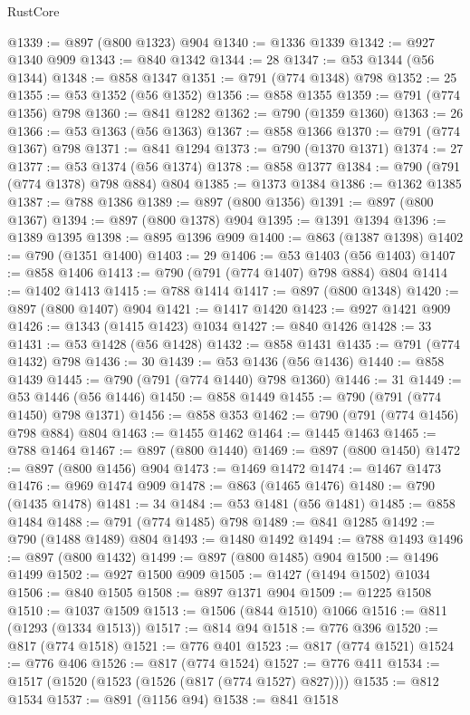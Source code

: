\begin{lexlean}{RustCore}
\begin{coremodule}
@1339 := @897 (@800 @1323) @904
@1340 := @1336 @1339
@1342 := @927 @1340 @909
@1343 := @840 @1342
@1344 := 28
@1347 := @53 @1344 (@56 @1344)
@1348 := @858 @1347
@1351 := @791 (@774 @1348) @798
@1352 := 25
@1355 := @53 @1352 (@56 @1352)
@1356 := @858 @1355
@1359 := @791 (@774 @1356) @798
@1360 := @841 @1282
@1362 := @790 (@1359 @1360)
@1363 := 26
@1366 := @53 @1363 (@56 @1363)
@1367 := @858 @1366
@1370 := @791 (@774 @1367) @798
@1371 := @841 @1294
@1373 := @790 (@1370 @1371)
@1374 := 27
@1377 := @53 @1374 (@56 @1374)
@1378 := @858 @1377
@1384 := @790 (@791 (@774 @1378) @798 @884) @804
@1385 := @1373 @1384
@1386 := @1362 @1385
@1387 := @788 @1386
@1389 := @897 (@800 @1356)
@1391 := @897 (@800 @1367)
@1394 := @897 (@800 @1378) @904
@1395 := @1391 @1394
@1396 := @1389 @1395
@1398 := @895 @1396 @909
@1400 := @863 (@1387 @1398)
@1402 := @790 (@1351 @1400)
@1403 := 29
@1406 := @53 @1403 (@56 @1403)
@1407 := @858 @1406
@1413 := @790 (@791 (@774 @1407) @798 @884) @804
@1414 := @1402 @1413
@1415 := @788 @1414
@1417 := @897 (@800 @1348)
@1420 := @897 (@800 @1407) @904
@1421 := @1417 @1420
@1423 := @927 @1421 @909
@1426 := @1343 (@1415 @1423) @1034
@1427 := @840 @1426
@1428 := 33
@1431 := @53 @1428 (@56 @1428)
@1432 := @858 @1431
@1435 := @791 (@774 @1432) @798
@1436 := 30
@1439 := @53 @1436 (@56 @1436)
@1440 := @858 @1439
@1445 := @790 (@791 (@774 @1440) @798 @1360)
@1446 := 31
@1449 := @53 @1446 (@56 @1446)
@1450 := @858 @1449
@1455 := @790 (@791 (@774 @1450) @798 @1371)
@1456 := @858 @353
@1462 := @790 (@791 (@774 @1456) @798 @884) @804
@1463 := @1455 @1462
@1464 := @1445 @1463
@1465 := @788 @1464
@1467 := @897 (@800 @1440)
@1469 := @897 (@800 @1450)
@1472 := @897 (@800 @1456) @904
@1473 := @1469 @1472
@1474 := @1467 @1473
@1476 := @969 @1474 @909
@1478 := @863 (@1465 @1476)
@1480 := @790 (@1435 @1478)
@1481 := 34
@1484 := @53 @1481 (@56 @1481)
@1485 := @858 @1484
@1488 := @791 (@774 @1485) @798
@1489 := @841 @1285
@1492 := @790 (@1488 @1489) @804
@1493 := @1480 @1492
@1494 := @788 @1493
@1496 := @897 (@800 @1432)
@1499 := @897 (@800 @1485) @904
@1500 := @1496 @1499
@1502 := @927 @1500 @909
@1505 := @1427 (@1494 @1502) @1034
@1506 := @840 @1505
@1508 := @897 @1371 @904
@1509 := @1225 @1508
@1510 := @1037 @1509
@1513 := @1506 (@844 @1510) @1066
@1516 := @811 (@1293 (@1334 @1513))
@1517 := @814 @94
@1518 := @776 @396
@1520 := @817 (@774 @1518)
@1521 := @776 @401
@1523 := @817 (@774 @1521)
@1524 := @776 @406
@1526 := @817 (@774 @1524)
@1527 := @776 @411
@1534 := @1517 (@1520 (@1523 (@1526 (@817 (@774 @1527) @827))))
@1535 := @812 @1534
@1537 := @891 (@1156 @94)
@1538 := @841 @1518

\end{coremodule}
\end{lexlean}
